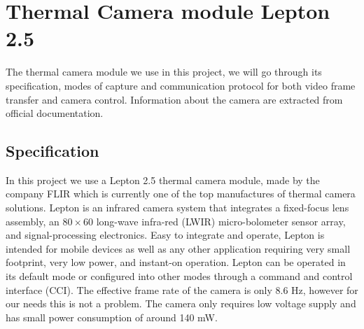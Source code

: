 \section{Thermal Camera module Lepton 2.5}
\label{sec:thermalcamera}
The thermal camera module we use in this project, we will go through its
specification, modes of capture and communication protocol for both video frame
transfer and camera control. Information about the camera are extracted from
official documentation.



\subsection{Specification}
\label{ssec:specificationthermalcam}
In this project we use a Lepton 2.5 thermal camera module, made by the company
FLIR which is currently one of the top manufactures of thermal camera solutions.
Lepton is an infrared camera system that integrates a fixed-focus lens assembly,
an $80 \times 60$ long-wave infra-red (LWIR) micro-bolometer sensor array, and
signal-processing electronics. Easy to integrate and operate, Lepton is intended
for mobile devices as well as any other application requiring very small
footprint, very low power, and instant-on operation. Lepton can be operated in
its default mode or configured into other modes through a command and control
interface (CCI). The effective frame rate of the camera is only 8.6 \si{\hertz},
however for our needs this is not a problem. The camera only requires low
voltage supply and has small power consumption of around 140 \si{\milli\watt}.
%
